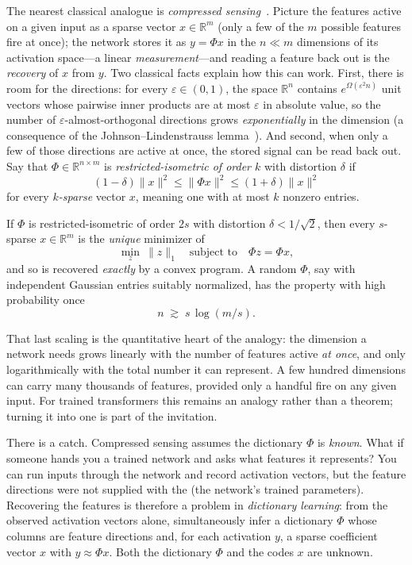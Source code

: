 The nearest classical analogue is \emph{compressed sensing}~\cite{candes2006,donoho2006}. Picture the features active on a given input as a sparse vector $x\in\mathbb{R}^m$ (only a few of the $m$ possible features fire at once); the network stores it as $y=\Phi x$ in the $n\ll m$ dimensions of its activation space---a linear \emph{measurement}---and reading a feature back out is the \emph{recovery} of $x$ from $y$. Two classical facts explain how this can work. First, there is room for the directions: for every $\varepsilon\in(0,1)$, the space $\mathbb{R}^n$ contains $e^{\Omega(\varepsilon^2 n)}$ unit vectors whose pairwise inner products are at most $\varepsilon$ in absolute value, so the number of $\varepsilon$-almost-orthogonal directions grows \emph{exponentially} in the dimension (a consequence of the Johnson--Lindenstrauss lemma~\cite{johnson1984}). And second, when only a few of those directions are active at once, the stored signal can be read back out. Say that $\Phi\in\mathbb{R}^{n\times m}$ is \emph{restricted-isometric of order $k$} with distortion $\delta$ if
\[
   (1-\delta)\|x\|^2\le\|\Phi x\|^2\le(1+\delta)\|x\|^2
\]
for every \emph{$k$-sparse} vector $x$, meaning one with at most $k$ nonzero entries.

\begin{theorem*}
If $\Phi$ is restricted-isometric of order $2s$ with distortion $\delta<1/\sqrt{2}$, then every $s$-sparse $x\in\mathbb{R}^m$ is the \emph{unique} minimizer of
\[
   \min_{z}\ \|z\|_1 \quad\text{subject to}\quad \Phi z=\Phi x,
\]
and so is recovered \emph{exactly} by a convex program. A random $\Phi$, say with independent Gaussian entries suitably normalized, has the property with high probability once
\[
   n \;\gtrsim\; s\,\log(m/s).
\]
\end{theorem*}

\noindent That last scaling is the quantitative heart of the analogy: the dimension a network needs grows linearly with the number of features active \emph{at once}, and only logarithmically with the total number it can represent. A few hundred dimensions can carry many thousands of features, provided only a handful fire on any given input. For trained transformers this remains an analogy rather than a theorem; turning it into one is part of the invitation.

There is a catch.
Compressed sensing assumes the dictionary $\Phi$ is \emph{known}.
What if someone hands you a trained network and asks what features it
represents?
You can run inputs through the network and record activation vectors,
but the feature directions were not supplied with the
 (the network's trained parameters).
Recovering the features is therefore a problem in \emph{dictionary learning}:
from the observed activation vectors alone, simultaneously infer a dictionary
$\Phi$ whose columns are feature directions and, for each activation $y$,
a sparse coefficient vector $x$ with $y\approx\Phi x$.
Both the dictionary $\Phi$ and the codes $x$ are unknown.

